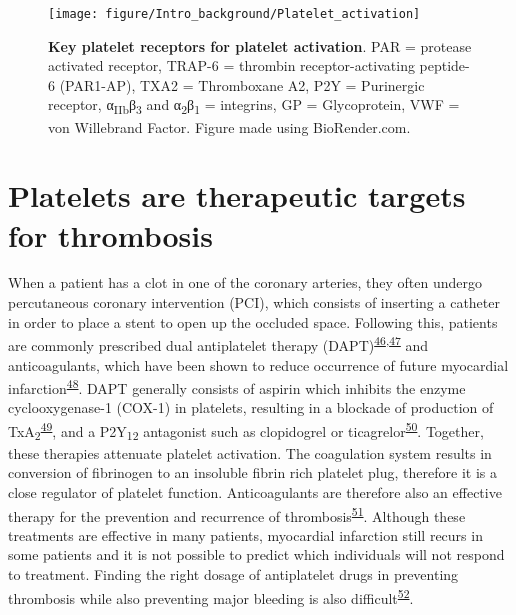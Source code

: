 \documentclass[11pt,twoside]{bristolthesis}
\begin{document}
\begin{figure}

{\centering \texttt{[image: figure/Intro\_background/Platelet\_activation]} 

}

\caption[Key platelet receptors for platelet activation]{\textbf{Key platelet receptors for platelet activation}. PAR = protease activated receptor, TRAP-6 = thrombin receptor-activating peptide-6 (PAR1-AP), TXA2 = Thromboxane A2, P2Y = Purinergic receptor, α\textsubscript{IIb}β\textsubscript{3} and α\textsubscript{2}β\textsubscript{1} = integrins, GP = Glycoprotein, VWF = von Willebrand Factor. Figure made using BioRender.com.}\label{fig:platelet-activation-receptors}
\end{figure}
\hypertarget{platelets-are-therapeutic-targets-for-thrombosis}{%
\section{Platelets are therapeutic targets for thrombosis}\label{platelets-are-therapeutic-targets-for-thrombosis}}

When a patient has a clot in one of the coronary arteries, they often undergo percutaneous coronary intervention (PCI), which consists of inserting a catheter in order to place a stent to open up the occluded space. Following this, patients are commonly prescribed dual antiplatelet therapy (DAPT)\textsuperscript{\protect\hyperlink{ref-Freynhofer2017a}{46},\protect\hyperlink{ref-Nardin2015}{47}} and anticoagulants, which have been shown to reduce occurrence of future myocardial infarction\textsuperscript{\protect\hyperlink{ref-Khan2020}{48}}. DAPT generally consists of aspirin which inhibits the enzyme cyclooxygenase-1 (COX-1) in platelets, resulting in a blockade of production of TxA\textsubscript{2}\textsuperscript{\protect\hyperlink{ref-Warner2011}{49}}, and a P2Y\textsubscript{12} antagonist such as clopidogrel or ticagrelor\textsuperscript{\protect\hyperlink{ref-Degrauwe2017}{50}}. Together, these therapies attenuate platelet activation. The coagulation system results in conversion of fibrinogen to an insoluble fibrin rich platelet plug, therefore it is a close regulator of platelet function. Anticoagulants are therefore also an effective therapy for the prevention and recurrence of thrombosis\textsuperscript{\protect\hyperlink{ref-Grover2019}{51}}. Although these treatments are effective in many patients, myocardial infarction still recurs in some patients and it is not possible to predict which individuals will not respond to treatment. Finding the right dosage of antiplatelet drugs in preventing thrombosis while also preventing major bleeding is also difficult\textsuperscript{\protect\hyperlink{ref-Mullen2021}{52}}.
\end{document}
